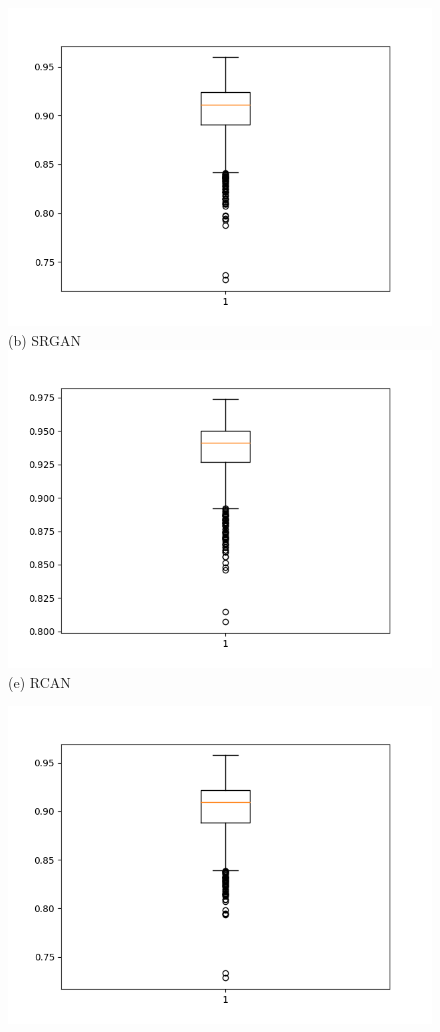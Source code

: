 \documentclass[conference]{IEEEtran}
\begin{document}
\begin{figure}[h!]
\begin{minipage}{0.3\textwidth}
  \includegraphics[width=\textwidth,height=0.2\textheight]{Figures/srgan_ssim_rgb.png}
  (b) SRGAN 
  \includegraphics[width=\textwidth,height=0.2\textheight]{Figures/rcan_ssim_rgb.png}
  (e) RCAN 
  \end{minipage}%
  \begin{minipage}{0.3\textwidth}
  \centering
  \includegraphics[width=\textwidth,height=0.2\textheight]{Figures/cyclegan_ssim_rgb.png}

\end{minipage}
\end{figure}
\end{document}
